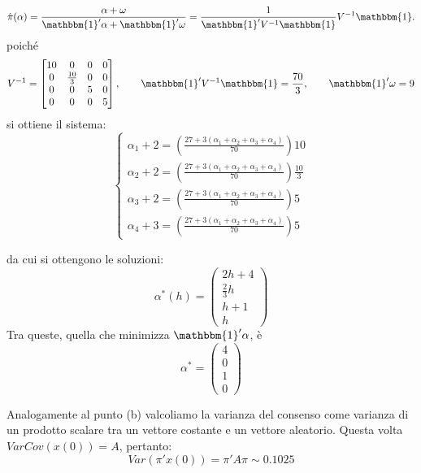 \begin{alphaparts}
    \[\hat{\pi}(\alpha) = \frac{\alpha+ \omega}{\mathbbm{1}'\alpha+\mathbbm{1}'\omega} = \frac{1}{\mathbbm{1}'V^{-1}\mathbbm{1}}V^{-1}\mathbbm{1}. \]
    poiché
    \[V^{-1} = \begin{bmatrix}
        10 & 0 & 0 & 0 \\
        0 & \frac{10}{3} & 0 & 0 \\
        0 & 0 & 5 & 0\\
        0 & 0 & 0 & 5
    \end{bmatrix}, \quad\quad \mathbbm{1}'V^{-1}\mathbbm{1} = \frac{70}{3}, \quad\quad \mathbbm{1}'\omega = 9 \]
    si ottiene il sistema:
    \[\begin{cases}
        \alpha_1 + 2 = \left(\frac{27+ 3(\alpha_1 + \alpha_2 + \alpha_3 + \alpha_4)}{70}\right)10\\
        \alpha_2 + 2 = \left(\frac{27+ 3(\alpha_1 + \alpha_2 + \alpha_3 + \alpha_4)}{70}\right) \frac{10}{3}\\
        \alpha_3+ 2 = \left(\frac{27+ 3(\alpha_1 + \alpha_2 + \alpha_3 + \alpha_4)}{70}\right) 5\\
        \alpha_4 + 3 = \left(\frac{27+ 3(\alpha_1 + \alpha_2 + \alpha_3 + \alpha_4)}{70}\right) 5
    \end{cases}\]

    da cui si ottengono le soluzioni:
    \[\alpha^*(h) = \begin{pmatrix}
        2h+ 4 \\ \frac{2}{3}h \\ h+ 1 \\ h
    \end{pmatrix}\]
    Tra queste, quella che minimizza \(\mathbbm{1}'\alpha\), è
    \[\alpha^* = \begin{pmatrix}
        4 \\ 0 \\ 1 \\ 0
    \end{pmatrix}\] 

    \questionpart %
    Analogamente al punto (b) valcoliamo la varianza del consenso come varianza di un prodotto scalare tra un vettore costante e un vettore aleatorio. Questa volta \(VarCov(x(0))= A\), pertanto:
    \[Var(\pi'x(0)) = \pi'A\pi \sim 0.1025\]


\end{alphaparts}
